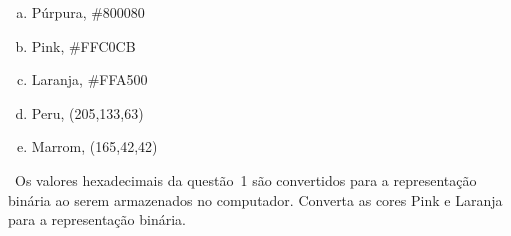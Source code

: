 \begin{enumerate}[a)]
\item Púrpura, \#800080  %
\item Pink, \#FFC0CB %
\item Laranja, \#FFA500	%
\item Peru, (205,133,63) %
\item Marrom, (165,42,42) %
\end{enumerate}


~Os valores hexadecimais da questão~1 são convertidos para
a representação binária ao serem armazenados no computador. Converta
as cores Pink e Laranja para a representação binária.


